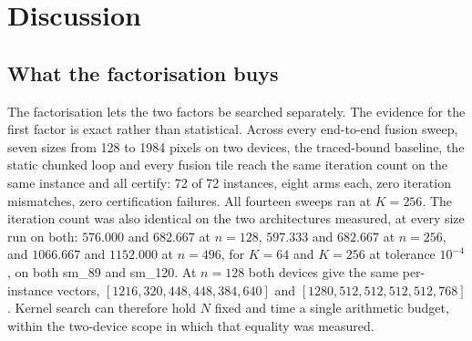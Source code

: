 \section{Discussion}

\subsection{What the factorisation buys}

The factorisation lets the two factors be searched separately. The evidence for
the first factor is exact rather than statistical. Across every end-to-end
fusion sweep, seven sizes from 128 to 1984 pixels on two devices, the
traced-bound baseline, the static chunked loop and every fusion tile reach the
same iteration count on the same instance and all certify: 72 of 72 instances,
eight arms each, zero iteration mismatches, zero certification failures. All
fourteen sweeps ran at $K=256$.
The iteration count was also identical on the two architectures measured, at
every size run on both: $576.000$ and $682.667$ at $n{=}128$, $597.333$ and
$682.667$ at $n{=}256$, and $1066.667$ and $1152.000$ at $n{=}496$, for $K=64$
and $K=256$ at tolerance $10^{-4}$, on both sm\_89 and sm\_120. At $n{=}128$
both devices give the same per-instance vectors,
$[1216, 320, 448, 448, 384, 640]$ and $[1280, 512, 512, 512, 512, 768]$.
Kernel search can therefore hold $N$ fixed and time a single arithmetic budget,
within the two-device scope in which that equality was measured.

